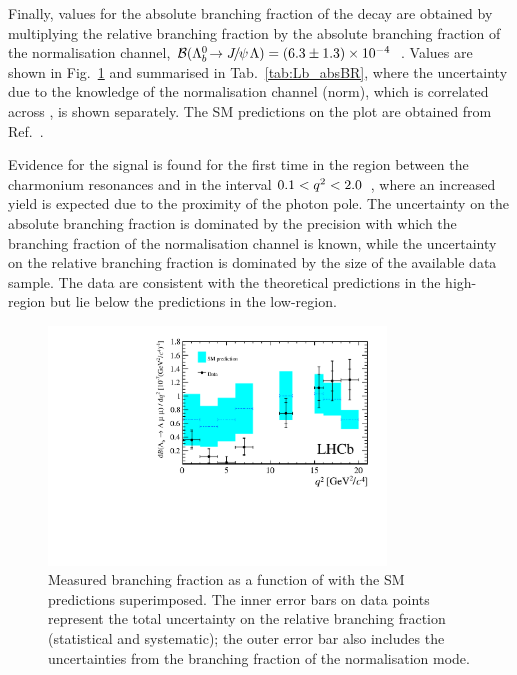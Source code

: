 Finally, values for the absolute branching fraction of the \decay{\Lb}{\Lz\mumu} decay are obtained by multiplying 
the relative branching fraction by the absolute branching fraction of the normalisation channel,
$\BF(\decay{\Lb}{\jpsi\Lz})=(6.3\pm1.3)\times10^{-4}$~\cite{PDG2014}.
Values are shown in Fig.~\ref{fig:Lb_absBR} and summarised in Tab.~\ref{tab:Lb_absBR}, where the uncertainty
due to the knowledge of the normalisation channel (norm), which is correlated across \qsq, is shown separately.
The SM predictions on the plot are obtained from Ref.~\cite{Detmold:2012vy}.  

Evidence for the signal is found for the first time in the \qsq region between the charmonium 
resonances and in the interval \mbox{$0.1 < q^2 < 2.0$~\gevgevcccc}, where an increased 
yield is expected due to the proximity of the photon pole. The uncertainty on the absolute branching
fraction is dominated by the precision with which the branching fraction of the normalisation channel is known,
while the uncertainty on the relative branching fraction is dominated by the size of the available data sample. 
The data are consistent with the theoretical predictions in the high-\qsq region but lie below the predictions in the low-\qsq region.

\begin{figure}
\centering
\includegraphics[width=0.8\textwidth]{Lmumu/figs/paper/figure5.pdf}
\caption{Measured \protect\decay{\Lb}{\Lz\mumu} branching
   fraction as a function of \qsq with the SM predictions
   \cite{Detmold:2012vy} superimposed.  The inner error bars on data
   points represent the total uncertainty on the relative branching
   fraction (statistical and systematic); the outer error bar also
   includes the uncertainties from the branching fraction of the
   normalisation mode.}  
\label{fig:Lb_absBR}
\end{figure}

